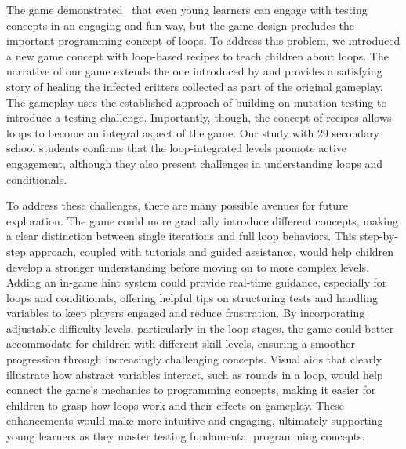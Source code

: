 
The \toolname game demonstrated~\cite{DBLP:conf/icst/StraubingerBF24} that even young learners can engage
with testing concepts in an engaging and fun way, but the game design
precludes the important programming concept of loops. To address this
problem, we introduced a new game concept with loop-based recipes to
teach children about loops. The narrative of our game extends the one
introduced by \toolname and provides a satisfying story of healing
the infected critters collected as part of the original gameplay. The
gameplay uses the established approach of building on mutation testing
to introduce a testing challenge. Importantly, though, the concept of
recipes allows loops to become an integral aspect of the game. Our
study with 29 secondary school students confirms that the
loop-integrated levels promote active engagement, although they also
present challenges in understanding loops and conditionals.


To address these challenges, there are many possible avenues for
future exploration. The game could more gradually introduce different concepts,
making a clear distinction between single iterations and full loop
behaviors. This step-by-step approach, coupled with tutorials and
guided assistance, would help children develop a stronger
understanding before moving on to more complex levels. Adding an
in-game hint system could provide real-time guidance, especially for
loops and conditionals, offering helpful tips on structuring tests and
handling variables to keep players engaged and reduce frustration. By
incorporating adjustable difficulty levels, particularly in the loop
stages, the game could better accommodate for children with different
skill levels, ensuring a smoother progression through increasingly
challenging concepts. Visual aids that clearly illustrate how abstract
variables interact, such as rounds in a loop, would help connect the
game's mechanics to programming concepts, making it easier for
children to grasp how loops work and their effects on gameplay. These
enhancements would make \toolname more intuitive and engaging,
ultimately supporting young learners as they master testing
fundamental programming concepts.
\vspace{1em}

